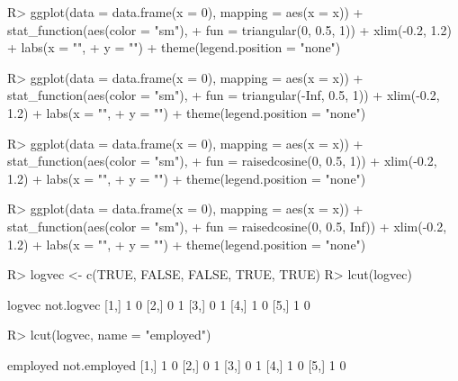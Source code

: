 \documentclass{article}\usepackage[]{graphicx}\usepackage[]{color}
\begin{document}
\begin{Schunk}
\begin{Sinput}
R> ggplot(data = data.frame(x = 0), mapping = aes(x = x)) + stat_function(aes(color = "sm"), 
+      fun = triangular(0, 0.5, 1)) + xlim(-0.2, 1.2) + labs(x = "", 
+      y = "") + theme(legend.position = "none")
\end{Sinput}
\end{Schunk}

\begin{Schunk}
\begin{Sinput}
R> ggplot(data = data.frame(x = 0), mapping = aes(x = x)) + stat_function(aes(color = "sm"), 
+      fun = triangular(-Inf, 0.5, 1)) + xlim(-0.2, 1.2) + labs(x = "", 
+      y = "") + theme(legend.position = "none")
\end{Sinput}
\end{Schunk}

\begin{Schunk}
\begin{Sinput}
R> ggplot(data = data.frame(x = 0), mapping = aes(x = x)) + stat_function(aes(color = "sm"), 
+      fun = raisedcosine(0, 0.5, 1)) + xlim(-0.2, 1.2) + labs(x = "", 
+      y = "") + theme(legend.position = "none")
\end{Sinput}
\end{Schunk}

\begin{Schunk}
\begin{Sinput}
R> ggplot(data = data.frame(x = 0), mapping = aes(x = x)) + stat_function(aes(color = "sm"), 
+      fun = raisedcosine(0, 0.5, Inf)) + xlim(-0.2, 1.2) + labs(x = "", 
+      y = "") + theme(legend.position = "none")
\end{Sinput}
\end{Schunk}

\begin{Schunk}
% --begin: "lcut.logical"
\begin{Sinput}
R> logvec <- c(TRUE, FALSE, FALSE, TRUE, TRUE)
R> lcut(logvec)
\end{Sinput}
\begin{Soutput}
     logvec not.logvec
[1,]      1          0
[2,]      0          1
[3,]      0          1
[4,]      1          0
[5,]      1          0
\end{Soutput}
\begin{Sinput}
R> lcut(logvec, name = "employed")
\end{Sinput}
\begin{Soutput}
     employed not.employed
[1,]        1            0
[2,]        0            1
[3,]        0            1
[4,]        1            0
[5,]        1            0
\end{Soutput}
%
% --end: "lcut.logical"
\end{Schunk}
\end{document}
